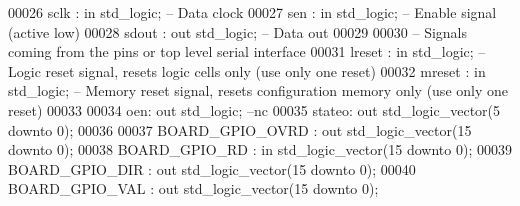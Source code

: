 \begin{DoxyCode}
00026         \textcolor{vhdlchar}{sclk}    \textcolor{vhdlchar}{:} \textcolor{keywordflow}{in} \textcolor{comment}{std\_logic};\textcolor{keyword}{     -- Data clock}
00027         \textcolor{vhdlchar}{sen} \textcolor{vhdlchar}{:} \textcolor{keywordflow}{in} \textcolor{comment}{std\_logic};\textcolor{keyword}{ -- Enable signal (active low)}
00028         \textcolor{vhdlchar}{sdout}   \textcolor{vhdlchar}{:} \textcolor{keywordflow}{out} \textcolor{comment}{std\_logic};\textcolor{keyword}{    -- Data out}
00029     
00030 \textcolor{keyword}{        -- Signals coming from the pins or top level serial interface}
00031         \textcolor{vhdlchar}{lreset}  \textcolor{vhdlchar}{:} \textcolor{keywordflow}{in} \textcolor{comment}{std\_logic};\textcolor{keyword}{     -- Logic reset signal, resets logic cells only  (use only one reset)}
00032         \textcolor{vhdlchar}{mreset}  \textcolor{vhdlchar}{:} \textcolor{keywordflow}{in} \textcolor{comment}{std\_logic};\textcolor{keyword}{     -- Memory reset signal, resets configuration memory only (use only one
       reset)}
00033         
00034         \textcolor{vhdlchar}{oen}\textcolor{vhdlchar}{:} \textcolor{keywordflow}{out} \textcolor{comment}{std\_logic};\textcolor{keyword}{ --nc}
00035         \textcolor{vhdlchar}{stateo}\textcolor{vhdlchar}{:} \textcolor{keywordflow}{out} \textcolor{comment}{std\_logic\_vector}\textcolor{vhdlchar}{(}\textcolor{vhdllogic}{}\textcolor{vhdllogic}{5} \textcolor{keywordflow}{downto} \textcolor{vhdllogic}{}\textcolor{vhdllogic}{0}\textcolor{vhdlchar}{)};
00036         
00037         \textcolor{vhdlchar}{BOARD_GPIO_OVRD}     \textcolor{vhdlchar}{:} \textcolor{keywordflow}{out} \textcolor{comment}{std\_logic\_vector}\textcolor{vhdlchar}{(}\textcolor{vhdllogic}{}\textcolor{vhdllogic}{15} \textcolor{keywordflow}{downto} \textcolor{vhdllogic}{}\textcolor{vhdllogic}{0}\textcolor{vhdlchar}{)};
00038         \textcolor{vhdlchar}{BOARD_GPIO_RD}           \textcolor{vhdlchar}{:} \textcolor{keywordflow}{in} \textcolor{comment}{std\_logic\_vector}\textcolor{vhdlchar}{(}\textcolor{vhdllogic}{}\textcolor{vhdllogic}{15} \textcolor{keywordflow}{downto} \textcolor{vhdllogic}{}\textcolor{vhdllogic}{0}\textcolor{vhdlchar}{)};
00039         \textcolor{vhdlchar}{BOARD_GPIO_DIR}          \textcolor{vhdlchar}{:} \textcolor{keywordflow}{out} \textcolor{comment}{std\_logic\_vector}\textcolor{vhdlchar}{(}\textcolor{vhdllogic}{}\textcolor{vhdllogic}{15} \textcolor{keywordflow}{downto} \textcolor{vhdllogic}{}\textcolor{vhdllogic}{0}\textcolor{vhdlchar}{)};
00040         \textcolor{vhdlchar}{BOARD_GPIO_VAL}          \textcolor{vhdlchar}{:} \textcolor{keywordflow}{out} \textcolor{comment}{std\_logic\_vector}\textcolor{vhdlchar}{(}\textcolor{vhdllogic}{}\textcolor{vhdllogic}{15} \textcolor{keywordflow}{downto} \textcolor{vhdllogic}{}\textcolor{vhdllogic}{0}\textcolor{vhdlchar}{)};

\end{DoxyCode}
